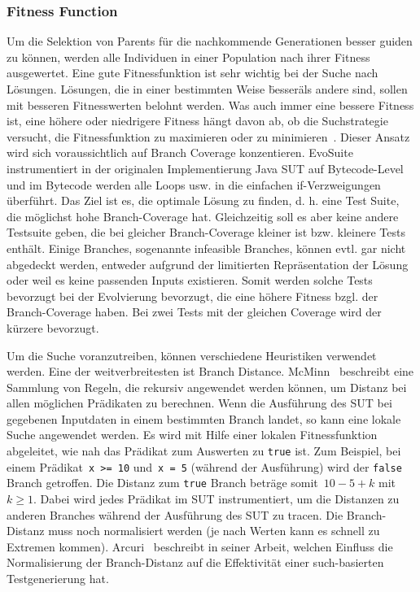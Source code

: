 \documentclass{article}
\begin{document}
\subsubsection{Fitness Function}
Um die Selektion von Parents für die nachkommende Generationen besser guiden zu können, werden alle Individuen in einer Population nach ihrer Fitness ausgewertet. Eine gute Fitnessfunktion ist sehr wichtig bei der Suche nach Lösungen. Lösungen, die in einer bestimmten Weise \"besser\" als andere sind, sollen mit besseren Fitnesswerten belohnt werden. Was auch immer eine bessere Fitness ist, eine höhere oder niedrigere Fitness hängt davon ab, ob die Suchstrategie versucht, die Fitnessfunktion zu maximieren oder zu minimieren~\cite{McMinn_2004}. Dieser Ansatz wird sich voraussichtlich auf Branch Coverage konzentieren. EvoSuite instrumentiert in der originalen Implementierung Java SUT auf Bytecode-Level und im Bytecode werden alle Loops usw. in die einfachen if-Verzweigungen überführt. Das Ziel ist es, die optimale Lösung zu finden, d. h. eine Test Suite, die möglichst hohe Branch-Coverage hat. Gleichzeitig soll es aber keine andere Testsuite geben, die bei gleicher Branch-Coverage kleiner ist bzw. kleinere Tests enthält. Einige Branches, sogenannte infeasible Branches, können evtl. gar nicht abgedeckt werden, entweder aufgrund der limitierten Repräsentation der Lösung oder weil es keine passenden Inputs existieren. Somit werden solche Tests bevorzugt bei der Evolvierung bevorzugt, die eine höhere Fitness bzgl. der Branch-Coverage haben. Bei zwei Tests mit der gleichen Coverage wird der kürzere bevorzugt. 

Um die Suche voranzutreiben, können verschiedene Heuristiken verwendet werden.  Eine der weitverbreitesten ist Branch Distance. McMinn~\cite{McMinn_2004} beschreibt eine Sammlung von Regeln, die rekursiv angewendet werden können, um Distanz bei allen möglichen Prädikaten zu berechnen. Wenn die Ausführung des \ac{SUT} bei gegebenen Inputdaten in einem bestimmten Branch landet, so kann eine lokale Suche angewendet werden. Es wird mit Hilfe einer lokalen Fitnessfunktion abgeleitet, wie nah das Prädikat zum Auswerten zu \lstinline{true} ist. Zum Beispiel, bei einem Prädikat~\lstinline{x >= 10} und~\lstinline{x = 5} (während der Ausführung) wird der \lstinline{false} Branch getroffen. Die Distanz zum \lstinline{true} Branch beträge somit~$10 - 5 + k$ mit~$k \geq 1$. Dabei wird jedes Prädikat im \ac{SUT} instrumentiert, um die Distanzen zu anderen Branches während der Ausführung des \ac{SUT} zu tracen. Die Branch-Distanz muss noch normalisiert werden (je nach Werten kann es schnell zu Extremen kommen). Arcuri~\cite{Arcuri_2011} beschreibt in seiner Arbeit, welchen Einfluss die Normalisierung der Branch-Distanz auf die Effektivität einer such-basierten Testgenerierung hat. 
\end{document}
